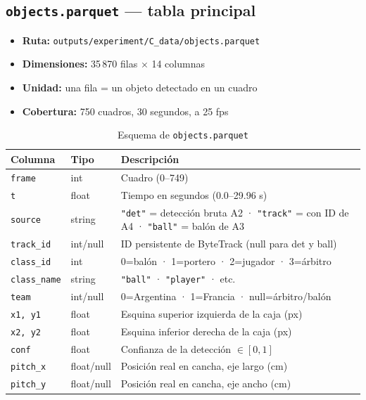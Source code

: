 \documentclass[11pt,a4paper]{article}
\begin{document}
\subsection{\texttt{objects.parquet} — tabla principal}

\begin{itemize}[noitemsep]
  \item \textbf{Ruta:} \texttt{outputs/experiment/C\_data/objects.parquet}
  \item \textbf{Dimensiones:} 35\,870 filas $\times$ 14 columnas
  \item \textbf{Unidad:} una fila = un objeto detectado en un cuadro
  \item \textbf{Cobertura:} 750 cuadros, 30 segundos, a 25 fps
\end{itemize}

\begin{table}[H]
\centering
\caption{Esquema de \texttt{objects.parquet}}
\label{tab:objects}
\begin{tabular}{lll}
\toprule
\textbf{Columna} & \textbf{Tipo} & \textbf{Descripción} \\
\midrule
\texttt{frame}      & int    & Cuadro (0–749) \\
\texttt{t}          & float  & Tiempo en segundos (0.0–29.96 s) \\
\texttt{source}     & string & \texttt{"det"} = detección bruta A2 ·
                               \texttt{"track"} = con ID de A4 ·
                               \texttt{"ball"} = balón de A3 \\
\texttt{track\_id}  & int/null & ID persistente de ByteTrack (null para det y ball) \\
\texttt{class\_id}  & int    & 0=balón · 1=portero · 2=jugador · 3=árbitro \\
\texttt{class\_name}& string & \texttt{"ball"} · \texttt{"player"} · etc. \\
\texttt{team}       & int/null & 0=Argentina · 1=Francia · null=árbitro/balón \\
\texttt{x1, y1}     & float  & Esquina superior izquierda de la caja (px) \\
\texttt{x2, y2}     & float  & Esquina inferior derecha de la caja (px) \\
\texttt{conf}       & float  & Confianza de la detección $\in [0,1]$ \\
\texttt{pitch\_x}   & float/null & Posición real en cancha, eje largo (cm) \\
\texttt{pitch\_y}   & float/null & Posición real en cancha, eje ancho (cm) \\
\bottomrule
\end{tabular}
\end{table}
\end{document}

